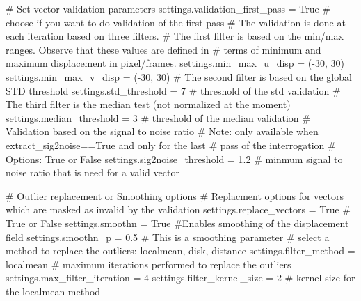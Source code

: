 \documentclass[
  english,
  letterpaper,
  numbers=noendperiod,
  DIV=13]{scrreprt}
\newenvironment{Shaded}{\begin{snugshade}}{\end{snugshade}}
\newcommand{\CommentTok}[1]{\textcolor[rgb]{0.37,0.37,0.37}{#1}}
\newcommand{\DecValTok}[1]{\textcolor[rgb]{0.68,0.00,0.00}{#1}}
\newcommand{\FloatTok}[1]{\textcolor[rgb]{0.68,0.00,0.00}{#1}}
\newcommand{\NormalTok}[1]{\textcolor[rgb]{0.00,0.23,0.31}{#1}}
\newcommand{\OperatorTok}[1]{\textcolor[rgb]{0.37,0.37,0.37}{#1}}
\newcommand{\StringTok}[1]{\textcolor[rgb]{0.13,0.47,0.30}{#1}}
\newcommand{\VariableTok}[1]{\textcolor[rgb]{0.07,0.07,0.07}{#1}}
\begin{document}
\begin{Shaded}
\begin{Highlighting}[]
\CommentTok{\# Set vector validation parameters}
\NormalTok{settings.validation\_first\_pass }\OperatorTok{=} \VariableTok{True} \CommentTok{\# choose if you want to do validation of the first pass}
\CommentTok{\# The validation is done at each iteration based on three filters.}
\CommentTok{\# The first filter is based on the min/max ranges. Observe that these values are defined in}
\CommentTok{\# terms of minimum and maximum displacement in pixel/frames.}
\NormalTok{settings.min\_max\_u\_disp }\OperatorTok{=}\NormalTok{ (}\OperatorTok{{-}}\DecValTok{30}\NormalTok{, }\DecValTok{30}\NormalTok{)}
\NormalTok{settings.min\_max\_v\_disp }\OperatorTok{=}\NormalTok{ (}\OperatorTok{{-}}\DecValTok{30}\NormalTok{, }\DecValTok{30}\NormalTok{)}
\CommentTok{\# The second filter is based on the global STD threshold}
\NormalTok{settings.std\_threshold }\OperatorTok{=} \DecValTok{7}  \CommentTok{\# threshold of the std validation}
\CommentTok{\# The third filter is the median test (not normalized at the moment)}
\NormalTok{settings.median\_threshold }\OperatorTok{=} \DecValTok{3}  \CommentTok{\# threshold of the median validation}
\CommentTok{\# Validation based on the signal to noise ratio\textquotesingle{}}
\CommentTok{\# Note: only available when extract\_sig2noise==True and only for the last}
\CommentTok{\# pass of the interrogation}
\CommentTok{\# Options: True or False}
\NormalTok{settings.sig2noise\_threshold }\OperatorTok{=} \FloatTok{1.2} \CommentTok{\# minmum signal to noise ratio that is need for a valid vector}

\CommentTok{\# Outlier replacement or Smoothing options}
\CommentTok{\# Replacment options for vectors which are masked as invalid by the validation}
\NormalTok{settings.replace\_vectors }\OperatorTok{=} \VariableTok{True} \CommentTok{\# True or False}
\NormalTok{settings.smoothn }\OperatorTok{=} \VariableTok{True} \CommentTok{\#Enables smoothing of the displacement field}
\NormalTok{settings.smoothn\_p }\OperatorTok{=} \FloatTok{0.5} \CommentTok{\# This is a smoothing parameter}
\CommentTok{\# select a method to replace the outliers: \textquotesingle{}localmean\textquotesingle{}, \textquotesingle{}disk\textquotesingle{}, \textquotesingle{}distance\textquotesingle{}}
\NormalTok{settings.filter\_method }\OperatorTok{=} \StringTok{\textquotesingle{}localmean\textquotesingle{}}
\CommentTok{\# maximum iterations performed to replace the outliers}
\NormalTok{settings.max\_filter\_iteration }\OperatorTok{=} \DecValTok{4}
\NormalTok{settings.filter\_kernel\_size }\OperatorTok{=} \DecValTok{2}  \CommentTok{\# kernel size for the localmean method}


\end{Highlighting}
\end{Shaded}
\end{document}
